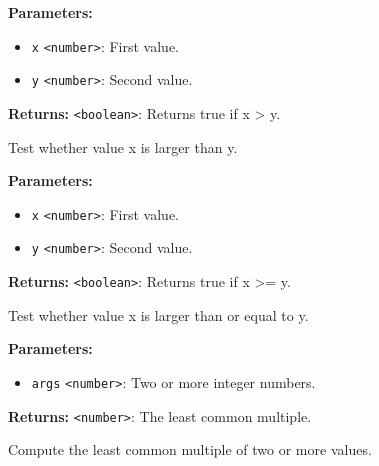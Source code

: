 \documentclass[12pt,a4paper]{article}
\begin{document}
\vspace{5mm}
\noindent {}


\noindent \textbf{Parameters:}
\begin{itemize}
  \item \texttt{x} \texttt{<number>}: First value.
  \item \texttt{y} \texttt{<number>}: Second value.
\end{itemize}

\noindent \textbf{Returns:} \texttt{<boolean>}: Returns true if x > y.

\noindent Test whether value x is larger than y.

\vspace{5mm}
\noindent {}


\noindent \textbf{Parameters:}
\begin{itemize}
  \item \texttt{x} \texttt{<number>}: First value.
  \item \texttt{y} \texttt{<number>}: Second value.
\end{itemize}

\noindent \textbf{Returns:} \texttt{<boolean>}: Returns true if x >= y.

\noindent Test whether value x is larger than or equal to y.

\vspace{5mm}
\noindent {}


\noindent \textbf{Parameters:}
\begin{itemize}
  \item \texttt{args} \texttt{<number>}: Two or more integer numbers.
\end{itemize}

\noindent \textbf{Returns:} \texttt{<number>}: The least common multiple.

\noindent Compute the least common multiple of two or more values.

\vspace{5mm}
\noindent {}
\end{document}
